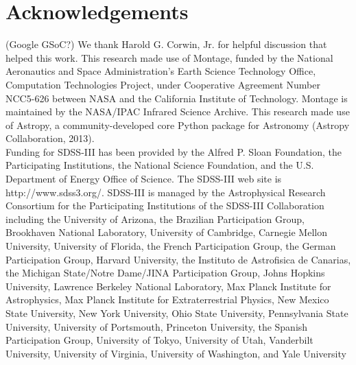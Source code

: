 \documentclass[5p]{elsarticle}
\begin{document}
\section*{Acknowledgements}
\footnotesize
\indent (Google\/ GSoC?) We thank Harold G. Corwin, Jr. for helpful discussion that helped this work. This research made use of Montage, funded by the National Aeronautics and Space Administration's Earth Science Technology Office, Computation Technologies Project, under Cooperative Agreement Number NCC5-626 between NASA and the California Institute of Technology. Montage is maintained by the NASA/IPAC Infrared Science Archive. This research made use of Astropy, a community-developed core Python package for Astronomy (Astropy Collaboration, 2013).
\\
\indent  Funding for SDSS-III has been provided by the Alfred P. Sloan Foundation, the Participating Institutions, the National Science Foundation, and the U.S. Department of Energy Office of Science. The SDSS-III web site is http://www.sdss3.org/. SDSS-III is managed by the Astrophysical Research Consortium for the Participating Institutions of the SDSS-III Collaboration including the University of Arizona, the Brazilian Participation Group, Brookhaven National Laboratory, University of Cambridge, Carnegie Mellon University, University of Florida, the French Participation Group, the German Participation Group, Harvard University, the Instituto de Astrofisica de Canarias, the Michigan State/Notre Dame/JINA Participation Group, Johns Hopkins University, Lawrence Berkeley National Laboratory, Max Planck Institute for Astrophysics, Max Planck Institute for Extraterrestrial Physics, New Mexico State University, New York University, Ohio State University, Pennsylvania State University, University of Portsmouth, Princeton University, the Spanish Participation Group, University of Tokyo, University of Utah, Vanderbilt University, University of Virginia, University of Washington, and Yale University


 
\end{document}
